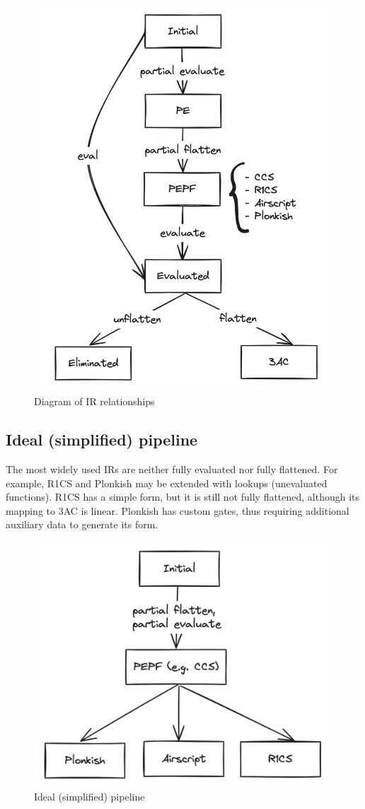 \documentclass[
    9pt,            %
    techreport,        %
    affiltop,       %
]{art}
\begin{document}
\begin{figure}[H]
    \centering
    \includegraphics[width=0.5\linewidth]{relationships-diagram.png}
    \caption{Diagram of IR relationships}
    \label{fig:enter-label}
\end{figure}

\subsection{Ideal (simplified) pipeline}

The most widely used IRs are neither fully evaluated nor fully flattened. For example, R1CS and Plonkish may be extended with lookups (unevaluated functions). R1CS has a simple form, but it is still not fully flattened, although its mapping to 3AC is linear. Plonkish has custom gates, thus requiring additional auxiliary data to generate its form.

\begin{figure}[H]
    \centering
    \includegraphics[width=0.5\linewidth]{ideal-pipeline.png}
    \caption{Ideal (simplified) pipeline}
    \label{fig:enter-label}
\end{figure}
\end{document}
